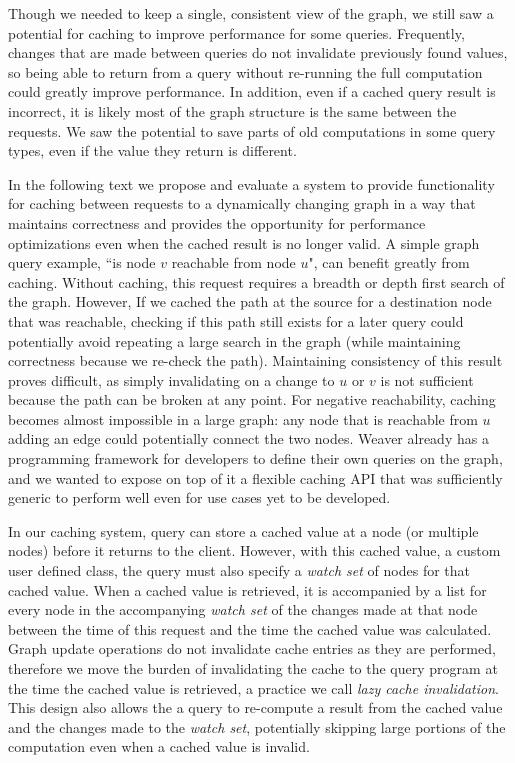 \documentclass[letterpaper,twocolumn,11pt,tight]{article}
\begin{document}
Though we needed to keep a single, consistent view of the graph, we still saw a potential for caching to improve performance for some queries. Frequently, changes that are made between queries do not invalidate previously found values, so being able to return from a query without re-running the full computation could greatly improve performance.
In addition, even if a cached query result is incorrect, it is likely most of the graph structure is the same between the requests.
We saw the potential to save parts of old computations in some query types, even if the value they return is different.

In the following text we propose and evaluate a system to provide functionality for caching between requests to a dynamically changing graph in a way that maintains correctness and provides the opportunity for performance optimizations even when the cached result is no longer valid.
A simple graph query example, ``is node $v$ reachable from node $u$", can benefit greatly from caching.
Without caching, this request requires a breadth or depth first search of the graph.
However, If we cached the path at the source for a destination node that was reachable, checking if this path still exists for a later query could potentially avoid repeating a large search in the graph (while maintaining correctness because we re-check the path).
Maintaining consistency of this result proves difficult, as simply invalidating on a change to $u$ or $v$ is not sufficient because the path can be broken at any point.
For negative reachability, caching becomes almost impossible in a large graph: any node that is reachable from $u$ adding an edge could potentially connect the two nodes.
Weaver already has a programming framework for developers to define their own queries on the graph, and we wanted to expose on top of it a flexible caching API that was sufficiently generic to perform well even for use cases yet to be developed.

In our caching system, query can store a cached value at a node (or multiple nodes) before it returns to the client. However, with this cached value, a custom user defined class, the query must also specify a \emph{watch set} of nodes for that cached value.
When a cached value is retrieved, it is accompanied by a list for every node in the accompanying \emph{watch set} of the changes made at that node between the time of this request and the time the cached value was calculated.
Graph update operations do not invalidate cache entries as they are performed, therefore we move the burden of invalidating the cache to the query program at the time the cached value is retrieved, a practice we call \emph{lazy cache invalidation}.
This design also allows the a query to re-compute a result from the cached value and the changes made to the \emph{watch set}, potentially skipping large portions of the computation even when a cached value is invalid.
\end{document}
